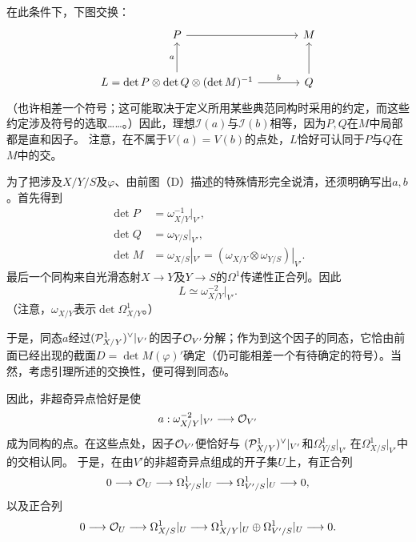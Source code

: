 在此条件下，下图交换：
\[
\begin{tikzcd}[row sep=large,column sep=large]
 P\arrow[r]&M\\
 L=\det P\otimes\det Q\otimes(\det M)^{-1}\arrow[u,"a"]
 \arrow[r,"b"]&Q\arrow[u]
\end{tikzcd}
\]
（也许相差一个符号；这可能取决于定义所用某些典范同构时采用的约定，而这些约定涉及符号的选取……。）因此，理想$\mathscr I(a)$与$\mathscr I(b)$相等，因为$P,Q$在$M$中局部都是直和因子。
注意，在不属于$V(a)=V(b)$的点处，$L$恰好可认同于$P$与$Q$在$M$中的交。

为了把涉及$X/Y/S$及$\varphi$、由前图（D）描述的特殊情形完全说清，还须明确写出$a,b$。首先得到
\begin{align*}
 \det P&=\omega_{X/Y}^{-1}|_{V'},\\
 \det Q&=\omega_{Y/S}|_{V'},\\
 \det M&=\omega_{X/S}|_{V'}
       =(\omega_{X/Y}\otimes\omega_{Y/S})|_{V'}.
\end{align*}
最后一个同构来自光滑态射$X\to Y$及$Y\to S$的$\Omega^1$传递性正合列。因此
\[
 L\simeq\omega_{X/Y}^{-2}|_{V'}.
\]
（注意，$\omega_{X/Y}$表示$\det\Omega^1_{X/Y}$。）

于是，同态$a$经过$(\mathcal P^1_{X/Y})^\vee|_{V'}$的因子$\mathcal O_{V'}$分解；作为到这个因子的同态，它恰由前面已经出现的截面$D=\det M(\varphi)'$确定（仍可能相差一个有待确定的符号）。当然，考虑引理所述的交换性，便可得到同态$b$。

因此，非超奇异点恰好是使
\[
 a:\omega_{X/Y}^{-2}|_{V'}\longrightarrow\mathcal O_{V'}
\]
成为同构的点。在这些点处，因子$\mathcal O_{V'}$便恰好与
$(\mathcal P^1_{X/Y})^\vee|_{V'}$和$\Omega^1_{Y/S}|_{V'}$
在$\Omega^1_{X/S}|_{V'}$中的交相认同。
于是，在由$V'$的非超奇异点组成的开子集$U$上，有正合列
\[
 0\longrightarrow\mathcal O_U\longrightarrow
 \Omega^1_{Y/S}|_U\longrightarrow\Omega^1_{V'/S}|_U
 \longrightarrow0,
\]
以及正合列
\[
 0\longrightarrow\mathcal O_U\longrightarrow
 \Omega^1_{X/S}|_U\longrightarrow
 \Omega^1_{X/Y}|_U\oplus\Omega^1_{V'/S}|_U
 \longrightarrow0.
\]


